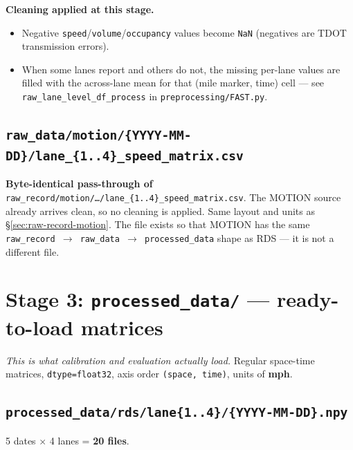 \documentclass[11pt]{article}
\newcommand{\code}[1]{\texttt{#1}}
\newcommand{\nan}{\code{NaN}}
\newcommand{\filename}[1]{\textcolor{accent}{\code{#1}}}
\begin{document}
\textbf{Cleaning applied at this stage.}
\begin{itemize}[leftmargin=*]
  \item Negative \code{speed}/\code{volume}/\code{occupancy} values become
    \nan{} (negatives are TDOT transmission errors).
  \item When some lanes report and others do not, the missing per-lane values
    are filled with the across-lane mean for that (mile marker, time) cell
    --- see \code{raw\_lane\_level\_df\_process} in
    \filename{preprocessing/FAST.py}.
\end{itemize}

\subsection{\filename{raw\_data/motion/\{YYYY-MM-DD\}/lane\_\{1..4\}\_speed\_matrix.csv}}
\label{sec:raw-data-motion}

\textbf{Byte-identical pass-through of}
\filename{raw\_record/motion/\dots/lane\_\{1..4\}\_speed\_matrix.csv}. The
MOTION source already arrives clean, so no cleaning is applied. Same layout
and units as \S\ref{sec:raw-record-motion}. The file exists so that MOTION has
the same \code{raw\_record $\to$ raw\_data $\to$ processed\_data} shape as
RDS --- it is not a different file.

\section{Stage 3: \texttt{processed\_data/} --- ready-to-load matrices}
\label{sec:processed}

\emph{This is what calibration and evaluation actually load.} Regular
space-time matrices, \code{dtype=float32}, axis order \code{(space, time)},
units of \textbf{mph}.

\subsection{\filename{processed\_data/rds/lane\{1..4\}/\{YYYY-MM-DD\}.npy}}
\label{sec:processed-rds}

5 dates $\times$ 4 lanes = \textbf{20 files}.
\end{document}
